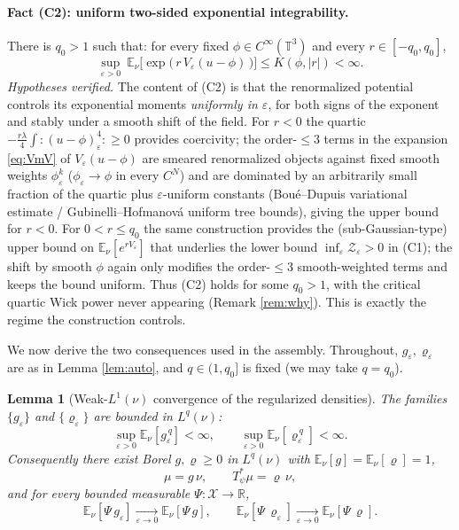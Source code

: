 \documentclass[12pt]{article}
\newcommand{\bR}{\mathbb{R}}
\newcommand{\bT}{\mathbb{T}}
\newcommand{\bE}{\mathbb{E}}
\newcommand{\Wick}[1]{{:}#1{:}}
\newcommand{\eps}{\varepsilon}
\theoremstyle{plain}
\newtheorem{lemma}{Lemma}
\theoremstyle{definition}
\begin{document}
\paragraph{Fact (C2): uniform two-sided exponential integrability.} There is
$q_0>1$ such that: for every fixed $\phi\in C^\infty(\bT^3)$ and every $r\in[-q_0,q_0]$,
\begin{equation}\label{eq:C2}
\sup_{\eps>0}\ \bE_\nu\!\Big[\exp\!\big(\,r\,V_\eps(u-\phi)\,\big)\Big]\le K(\phi,|r|)<\infty .
\end{equation}
\emph{Hypotheses verified.} The content of (C2) is that the renormalized potential
controls its exponential moments \emph{uniformly in $\eps$}, for both signs of the
exponent and stably under a smooth shift of the field. For $r<0$ the quartic
$-\tfrac{r\lambda}4\int\Wick{(u-\phi)_\eps^4}\ge0$ provides coercivity; the
order-$\le3$ terms in the expansion \eqref{eq:VmV} of $V_\eps(u-\phi)$ are smeared
renormalized objects against fixed smooth weights $\phi_\eps^k$ ($\phi_\eps\to\phi$ in
every $C^N$) and are dominated by an arbitrarily small fraction of the quartic plus
$\eps$-uniform constants (Bou\'e--Dupuis variational estimate / Gubinelli--Hofmanov\'a
uniform tree bounds), giving the upper bound for $r<0$. For $0<r\le q_0$ the same
construction provides the (sub-Gaussian-type) upper bound on $\bE_\nu[e^{rV_\eps}]$ that
underlies the lower bound $\inf_\eps\mathcal Z_\eps>0$ in (C1); the shift by smooth
$\phi$ again only modifies the order-$\le3$ smooth-weighted terms and keeps the bound
uniform. Thus (C2) holds for some $q_0>1$, with the critical quartic Wick power never
appearing (Remark \ref{rem:why}). This is exactly the regime the construction controls.

\medskip
We now derive the two consequences used in the assembly. Throughout, $g_\eps,\varrho_\eps$
are as in Lemma \ref{lem:auto}, and $q\in(1,q_0]$ is fixed (we may take $q=q_0$).

\begin{lemma}[Weak-$L^1(\nu)$ convergence of the regularized densities]\label{lem:weakL1}
The families $\{g_\eps\}$ and $\{\varrho_\eps\}$ are bounded in $L^{q}(\nu)$:
\begin{equation}\label{eq:Lq-bounds}
\sup_{\eps>0}\bE_\nu[g_\eps^{\,q}]<\infty,\qquad
\sup_{\eps>0}\bE_\nu[\varrho_\eps^{\,q}]<\infty .
\end{equation}
Consequently there exist Borel $g,\varrho\ge0$ in $L^q(\nu)$ with
$\bE_\nu[g]=\bE_\nu[\varrho]=1$,
\begin{equation}\label{eq:mu-rho}
\mu=g\,\nu,\qquad T_\psi^\ast\mu=\varrho\,\nu,
\end{equation}
and for every bounded measurable $\Psi:\mathcal X\to\bR$,
\begin{equation}\label{eq:weak-conv}
\bE_\nu[\Psi\,g_\eps]\xrightarrow[\eps\to0]{}\bE_\nu[\Psi\,g],\qquad
\bE_\nu[\Psi\,\varrho_\eps]\xrightarrow[\eps\to0]{}\bE_\nu[\Psi\,\varrho].
\end{equation}
\end{lemma}
\end{document}
